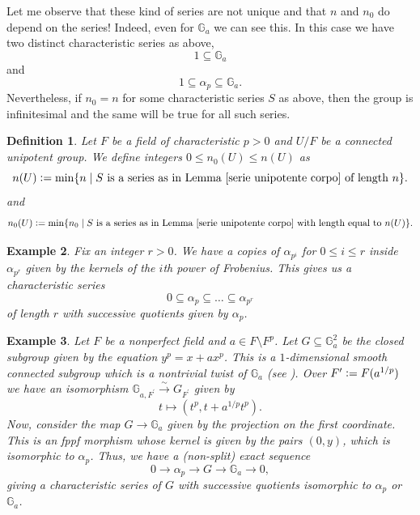 \documentclass[a4paper,english,12pt]{amsart}
\newtheorem{definition}{Definition}[section]
\newtheorem{example}[definition]{Example}
\numberwithin{equation}{section}
\newcommand{\defeq}{\vcentcolon=}
\renewcommand{\leq}{\leqslant}
\renewcommand{\_}{\rule{0.25cm}{0.4pt}}
\begin{document}
Let me observe that these kind of series are not unique and that $n$ and $n_{0}$ do depend on the series! Indeed, even for $\mathbb{G}_{a}$ we can see this. In this case we have two distinct characteristic series as above,
    \[
    1\subseteq \mathbb{G}_{a}
    \]
    and
    \[
    1\subseteq \alpha_{p}\subseteq \mathbb{G}_{a}.
    \]
Nevertheless, if $n_{0}=n$ for some characteristic series $S$ as above, then the group is infinitesimal and the same will be true for all such series.

\begin{definition}
    Let $F$ be a field of characteristic $p>0$ and $U/F$ be a connected unipotent group. We define integers $0\leq n_{0}(U)\leq n(U)$ as
    \[
    n(U)\defeq \min\{n\mid S \text{ is a series as in Lemma \ref{serie unipotente corpo} of length $n$}\}.
    \]
    and
    \[
    n_{0}(U)\defeq \min\{n_{0}\mid S \text{ is a series as in Lemma \ref{serie unipotente corpo} with length equal to $n(U)$}\}.
    \]
\end{definition}

\begin{example}
    Fix an integer $r>0$. We have a copies of $\alpha_{p^{i}}$ for $0\leq i\leq r$ inside $\alpha_{p^{r}}$ given by the kernels of the $i$th power of Frobenius. This gives us a characteristic series
    \[
    0\subseteq \alpha_{p}\subseteq \dots \subseteq \alpha_{p^{r}}
    \]
    of length $r$ with successive quotients given by $\alpha_{p}$.
\end{example}

\begin{example}
    Let $F$ be a nonperfect field and $a\in F\setminus F^{p}$. Let $G\subseteq \mathbb{G}_{a}^{2}$ be the closed subgroup given by the equation $y^{p}=x+ax^{p}$. This is a $1$-dimensional smooth connected subgroup which is a nontrivial twist of $\mathbb{G}_{a}$ (see \cite[Example 14.20.]{MilneAG}). Over $F^{\prime}\defeq F(a^{1/p})$ we have an isomorphism $\mathbb{G}_{a,F^{\prime}}\xrightarrow{\sim} G_{F^{\prime}}$ given by
    \[
    t\mapsto (t^{p}, t+a^{1/p}t^{p}).
    \]
    Now, consider the map $G\to \mathbb{G}_{a}$ given by the projection on the first coordinate. This is an fppf morphism whose kernel is given by the pairs $(0,y)$, which is isomorphic to $\alpha_{p}$. Thus, we have a (non-split) exact sequence
    \[
    0\to \alpha_{p}\to G\to \mathbb{G}_{a}\to 0,
    \]
    giving a characteristic series of $G$ with successive quotients isomorphic to $\alpha_{p}$ or $\mathbb{G}_{a}$.
\end{example}
\end{document}
